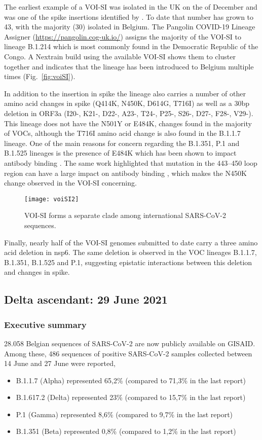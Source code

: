 The earliest example of a VOI-SI was isolated in the UK on the  of December and was one of the spike insertions identified by \citet{garry2021spike}.
To date that number has grown to 43, with the majority (30) isolated in Belgium.
The Pangolin COVID-19 Lineage Assigner (\url{https://pangolin.cog-uk.io/}) assigns the majority of the VOI-SI to lineage B.1.214 which is most commonly found in the Democratic Republic of the Congo.
A Nextrain build using the available VOI-SI shows them to cluster together and indicates that the lineage has been introduced to Belgium multiple times (Fig.~\ref{fig:voiSI}).

In addition to the insertion in spike the lineage also carries a number of other amino acid changes in spike (Q414K, N450K, D614G, T716I) as well as a 30bp deletion in ORF3a (I20-, K21-, D22-, A23-, T24-, P25-, S26-, D27-, F28-, V29-).
This lineage does not have the N501Y or E484K, changes found in the majority of VOCs, although the T716I amino acid change is also found in the B.1.1.7 lineage.
One of the main reasons for concern regarding the B.1.351, P.1 and B.1.525 lineages is the presence of E484K which has been shown to impact antibody binding \citep{Greaney2021}.
The same work highlighted that mutation in the 443--450 loop region can have a large impact on antibody binding \citep{Greaney2021}, which makes the N450K change observed in the VOI-SI concerning.

\begin{figure}[ht]
  \centering
  \texttt{[image: voiSI2]}
  \caption[VOI-SI clade]{VOI-SI forms a separate clade among international SARS-CoV-2 sequences.}
  \label{fig:voiSI2}
\end{figure}

Finally, nearly half of the VOI-SI genomes submitted to date carry a three amino acid deletion in nsp6.
The same deletion is observed in the VOC lineages B.1.1.7, B.1.351, B.1.525 and P.1, suggesting epistatic interactions between this deletion and changes in spike.

\subsection{Delta ascendant: 29 June 2021}
\subsubsection{Executive summary}

28.058 Belgian sequences of SARS-CoV-2 are now publicly available on GISAID.
Among these, 486 sequences of positive SARS-CoV-2 samples collected between 14 June and 27 June were reported,
\begin{itemize}
  \item B.1.1.7 (Alpha) represented 65,2\% (compared to 71,3\% in the last report)
  \item B.1.617.2 (Delta) represented 23\% (compared to 15,7\% in the last report)
  \item P.1 (Gamma) represented 8,6\% (compared to 9,7\% in the last report)
  \item B.1.351 (Beta) represented 0,8\% (compared to 1,2\% in the last report)
\end{itemize}

